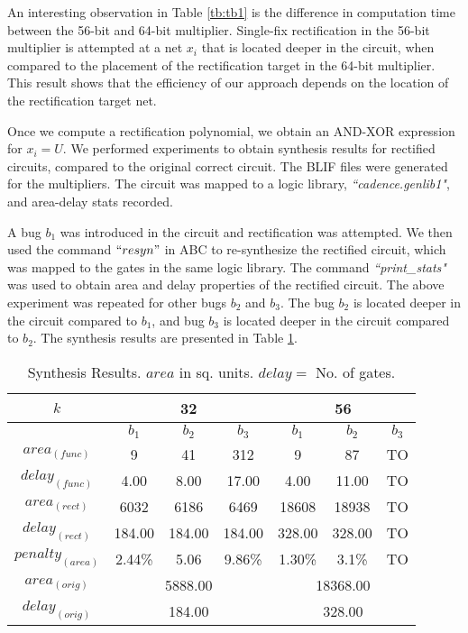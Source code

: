 An interesting observation in Table \ref{tb:tb1} is the difference in
computation time between the 56-bit and 64-bit multiplier. Single-fix
rectification in the 56-bit multiplier is attempted at a net $x_i$
that is located deeper in the circuit, when compared to the placement
of the rectification target in the 64-bit multiplier. This result
shows that the efficiency of our approach depends on the location of
the rectification target net.  

Once we compute a rectification polynomial, we  obtain
an AND-XOR expression for $x_i=U$. We performed experiments to obtain
synthesis results for rectified circuits, compared to the original
correct circuit.   The BLIF files were generated for the
multipliers. The circuit was mapped to a logic library,
\textit{``cadence.genlib1"}, and area-delay stats recorded.


A bug $b_1$ was introduced in the circuit and rectification was
attempted.
We then used the command $``resyn"$ in ABC to
re-synthesize the rectified circuit, which was mapped to the
gates in the same logic library. The command \textit{``print\_stats"}
was used to obtain area and delay properties of the rectified
circuit. The above experiment was repeated for other bugs $b_2$ and
$b_3$. The bug $b_2$ is located deeper in the circuit compared to
$b_1$, and bug $b_3$ is located deeper in the circuit compared to
$b_2$. The synthesis results are presented in Table \ref{tb:synth}. 

  \begin{table}
{
    \begin{tabular}{| c | c | c | c | c | c | c |}
    \hline
    $k$ & \multicolumn{3}{c|}{32} & \multicolumn{3}{c|}{56} \\ \hline
        & $b_1$ & $b_2$ & $b_3$ & $b_1$ & $b_2$ & $b_3$ \\ \hline 
    $area_{(func)}$ & 9 & 41 & 312 & 9 & 87 & TO \\ \hline
   $delay_{(func)}$ & 4.00 & 8.00 & 17.00 & 4.00 & 11.00 & TO \\ \hline     
    $area_{(rect)}$ &  6032 & 6186 & 6469 & 18608 & 18938 & TO \\ \hline     
    $delay_{(rect)}$ & 184.00 & 184.00 & 184.00 & 328.00 & 328.00 & TO \\ \hline  
    $penalty_{(area)}$ & 2.44\% & 5.06 & 9.86\% & 1.30\% & 3.1\% & TO \\ \hline
    $area_{(orig)}$ & \multicolumn{3}{c|}{5888.00} & \multicolumn{3}{c|}{18368.00} \\ \hline 
    
    $delay_{(orig)}$ &  \multicolumn{3}{c|}{184.00} & \multicolumn{3}{c|}{328.00} \\ \hline
    
    \end{tabular}
    \caption{Synthesis Results. $area$ in sq. units. $delay = $ No. of gates.}
    \label{tb:synth}
}
\end{table}


